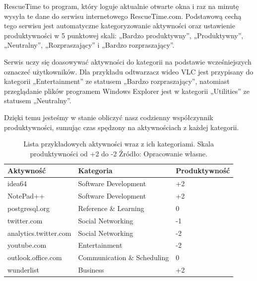 \documentclass[brudnopis]{xmgr}
\begin{document}

        RescueTime to program, który loguje aktualnie otwarte okna
        i raz na minutę wysyła te dane do serwisu internetowego RescueTime.com.
        Podstawową cechą tego serwisu jest automatyczne kategoryzowanie aktywności oraz ustawienie produktywności w 5 punktowej skali:
        „Bardzo produktywny”, „Produktywny”, „Neutralny”, „Rozpraszający” i „Bardzo rozpraszający”.

        Serwis uczy się doasowywać aktywności do kategorii na podstawie wcześniejszych oznaczeć użytkowników.
        Dla przykładu odtwarzacz wideo VLC jest przypisany do kategorii „Entertainment” ze statusem „Bardzo rozpraszający”,
        natomiast przeglądanie plików programem Windows Explorer jest w kategorii „Utilities” ze statusem „Neutralny”.

        Dzięki temu jesteśmy w stanie obliczyć nasz codzienny współczynnik produktywności,
        sumując czas spędzony na aktywnościach z każdej kategorii.

        \begin{table}[]
        \centering
        \begin{tabular}{lll}
        \hline
        \multicolumn{1}{l|}{Aktywność} & \multicolumn{1}{l|}{Kategoria} & Produktywność \\ \hline
        idea64                         & Software Development           & +2            \\
        NotePad++                      & Software Development           & +2            \\
        postgresql.org                 & Reference \& Learning          & 0             \\
        twitter.com                    & Social Networking              & -1            \\
        analytics.twitter.com          & Social Networking              & -2            \\
        youtube.com                    & Entertainment                  & -2            \\
        outlook.office.com             & Communication \& Scheduling    & 0             \\
        wunderlist                     & Business                       & +2
        \end{tabular}
        \caption{
            Lista przykładowych aktywności wraz z ich kategoriami. Skala produktywności od +2 do -2
            \newline Źródło: Opracowanie własne.
        }
        \label{RescueTime - lista przykładowych aktywności}
        \end{table}
\end{document}
